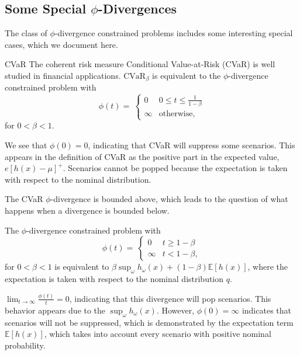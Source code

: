 \documentclass[ijoc,letterpaper]{informs3} %
\newcommand{\E}{\mathbb{E}}
\newcommand{\e}[1]{\E \left[ #1 \right]}
\begin{document}
\subsection{Some Special $\phi$-Divergences}
\label{ssec:special_phi}

The class of $\phi$-divergence constrained problems includes some interesting special cases, which we document here.

\begin{example}{CVaR}
	The coherent risk measure Conditional Value-at-Risk (CVaR) is well studied in financial applications.
	$\text{CVaR}_\beta$ is equivalent to the $\phi$-divergence constrained problem with 
	\[
		\phi(t) = \
		\begin{cases}
			0 & 0 \leq t \leq \frac{1}{1-\beta} \\
			\infty & \text{otherwise},
		\end{cases}
	\]
	for $0 < \beta < 1$.
\end{example}

\begin{remark}
	We see that $\phi(0) = 0$, indicating that CVaR will suppress some scenarios.
	This appears in the definition of CVaR as the positive part in the expected value, $e{[h(x)-\mu]^+}$.
	Scenarios cannot be popped because the expectation is taken with respect to the nominal distribution.
\end{remark}

The CVaR $\phi$-divergence is bounded above, which leads to the question of what happens when a divergence is bounded below.
\begin{example}
	The $\phi$-divergence constrained problem with
	\[
		\phi(t) = \
		\begin{cases}
			0 & t \geq 1-\beta \\
			\infty & t < 1-\beta,
		\end{cases}
	\]
	for $0 < \beta < 1$ is equivalent to $\beta \sup_\omega h_\omega(x) + (1-\beta)\e{h(x)}$, where the expectation is taken with respect to the nominal distribution $q$.
\end{example}

\begin{remark}
	$\lim_{t \rightarrow \infty} \frac{\phi(t)}{t} = 0$, indicating that this divergence will pop scenarios.
	This behavior appears due to the $\sup_\omega h_\omega(x)$.
	However, $\phi(0) = \infty$ indicates that scenarios will not be suppressed, which is demonstrated by the expectation term $\e{h(x)}$, which takes into account every scenario with positive nominal probability.
\end{remark}
\end{document}
